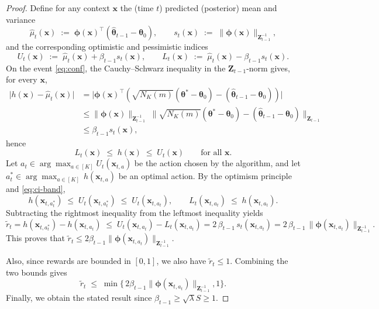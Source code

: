 \documentclass[pdflatex,sn-mathphys-num]{sn-jnl}%
\theoremstyle{thmstyleone}%
\theoremstyle{thmstyletwo}%
\theoremstyle{thmstylethree}%
\newcommand{\xbf}{\mathbf{x}}
\newcommand{\phibf}{\bm{\phi}}
\newcommand{\Zbf}{\mathbf{Z}}
\newcommand{\thetabf}{\bm{\theta}}
\begin{document}
\begin{appendices}
\begin{proof}
Define for any context $\xbf$ the (time $t$) predicted (posterior) mean and variance
\[
\hat{\mu}_{t}(\xbf)\;:=\;\phibf(\xbf)^\top (\hat{\bm{\theta}}_{t-1} - \thetabf_0),
\qquad
s_{t}(\xbf)\;:=\;\|\phibf(\xbf)\|_{\Zbf_{t-1}^{-1}},
\]
and the corresponding optimistic and pessimistic indices
\[
U_{t}(\xbf)\;:=\;\hat{\mu}_{t}(\xbf)+\beta_{t-1}s_{t}(\xbf),
\qquad
L_{t}(\xbf)\;:=\;\hat{\mu}_{t}(\xbf)-\beta_{t-1}s_{t}(\xbf).
\]
On the event \eqref{eq:conf}, the Cauchy–Schwarz inequality in the
$\Zbf_{t-1}$-norm gives, for every $\xbf$,
\begin{align*}
\bigl| h(\xbf)-\hat{\mu}_{t}(\xbf)\bigr|
&=\bigl|\phibf(\xbf)^\top(\sqrt{N_K(m)}(\bm{\theta}^*- \thetabf_0)-(\hat{\bm{\theta}}_{t-1}-\thetabf_0))\bigr| \\
&\le \|\phibf(\xbf)\|_{\Zbf_{t-1}^{-1}}\;\|\sqrt{N_K(m)}(\bm{\theta}^*- \thetabf_0)-(\hat{\bm{\theta}}_{t-1}-\thetabf_0)\|_{\Zbf_{t-1}} \\
&\le \beta_{t-1}s_{t}(\xbf),
\end{align*}
hence
\begin{equation}\label{eq:ci-band}
L_{t}(\xbf)\;\le\; h(\xbf)\;\le\; U_{t}(\xbf)\qquad \text{for all $\xbf$.}
\end{equation}
Let $a_t\in\arg\max_{a\in[K]}U_{t}(\xbf_{t,a})$ be the action chosen by the algorithm, and let
$a_t^*\in\arg\max_{a\in[K]}\,h(\xbf_{t,a})$ be an optimal action. By the optimism principle and \eqref{eq:ci-band},
\[
h(\xbf_{t,a_t^*})
\;\le\; U_{t}(\xbf_{t,a_t^*})
\;\le\; U_{t}(\xbf_{t,a_t}),
\qquad
L_{t}(\xbf_{t,a_t})
\;\le\; h(\xbf_{t,a_t}).
\]
Subtracting the rightmost inequality from the leftmost inequality yields
\[
\widetilde{r}_t
= h(\xbf_{t,a_t^*})-h(\xbf_{t,a_t})
\;\le\; U_{t}(\xbf_{t,a_t}) - L_{t}(\xbf_{t,a_t})
= 2\,\beta_{t-1}\,s_{t}(\xbf_{t,a_t})
= 2\,\beta_{t-1}\,\|\phibf(\xbf_{t,a_t})\|_{\Zbf_{t-1}^{-1}}.
\]
This proves  that $\widetilde{r}_t\le 2\beta_{t-1}\|\phibf(\xbf_{t,a_t})\|_{\Zbf_{t-1}^{-1}}$.

Also, since rewards are bounded in $[0,1]$, we also have $\widetilde{r}_t\le 1$. Combining the two bounds gives
\[
\widetilde{r}_t \;\le\; \min\bigl\{\,2\beta_{t-1}\|\phibf(\xbf_{t,a_t})\|_{\Zbf_{t-1}^{-1}},1\bigr\}.
\]
Finally, we obtain the stated result since $\beta_{t-1} \geq \sqrt{\lambda}S\geq 1$.
\end{proof}
















\end{appendices}
\end{document}
